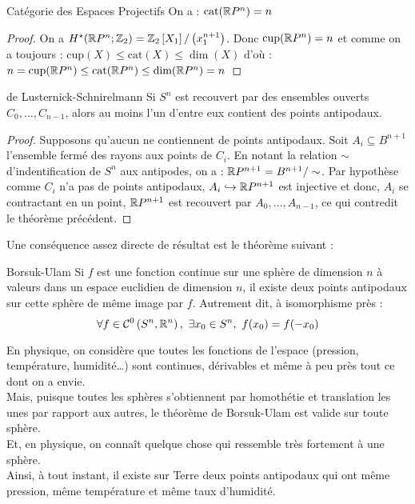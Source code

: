 \documentclass{cours}
\begin{document}
\begin{lemme}{Catégorie des Espaces Projectifs}{}
    On a\! : $\text{cat}(\mathbb{R} P^{n}) = n$
\end{lemme}
\begin{proof}
    On a $H^{\star}(\mathbb{R} P^{n}; \mathbb{Z}_{2}) = \mathbb{Z}_{2}\left[X_{1}\right]/\left(x_{1}^{n + 1}\right)$. Donc $\text{cup}(\mathbb{R} P^{n}) = n$ et comme on a toujours\! :
    $\text{cup}(X) \leq \text{cat}(X)\leq \dim(X)$ d'où\! : $n = \text{cup}(\mathbb{R} P^{n}) \leq \text{cat}(\mathbb{R} P^{n}) \leq \dim(\mathbb{R} P^{n}) = n$
\end{proof}

\begin{théorème}{de Lusternick-Schnirelmann}{}
Si $S^{n}$ est recouvert par des ensembles ouverts $C_{0}, \ldots, C_{n - 1}$, alors au moins l'un d'entre eux contient des points antipodaux.
\end{théorème}
\begin{proof}
    Supposons qu'aucun ne contiennent de points antipodaux. Soit $A_{i} \subseteq B^{n + 1}$ l'ensemble fermé des rayons aux points de $C_{i}$. En notant la relation $\sim$ d'indentification de $S^{n}$ aux antipodes, on a\! : $\mathbb{R} P^{n + 1} = B^{n + 1}/\sim$. Par hypothèse comme $C_{i}$ n'a pas de points antipodaux, $A_{i} \hookrightarrow \mathbb{R} P^{n+1}$ est injective et donc, $A_{i}$ se contractant en un point, $\mathbb{R} P^{n + 1}$ est recouvert par $A_{0}, \ldots, A_{n - 1}$, ce qui contredit le théorème précédent.
\end{proof}

Une conséquence assez directe de résultat est le théorème suivant\! :
\begin{théorème}{Borsuk-Ulam}{}
Si $f$ est une fonction continue sur une sphère de dimension $n$ à valeurs dans un espace euclidien de dimension $n$, il existe deux points antipodaux sur cette sphère de même image par $f$. Autrement dit, à isomorphisme près\! :
\[
    \forall f \in \mathcal{C}^{0}\left(S^{n}, \mathbb{R}^{n}\right), \ \exists x_{0} \in S^{n}, \ f(x_{0}) = f(-x_{0})
\]
\end{théorème}

\begin{remarque}{}{}
    En physique, on considère que toutes les fonctions de l'espace (pression, température, humidité\dots) sont continues, dérivables et même à peu près tout ce dont on a envie.\\
    Mais, puisque toutes les sphères s'obtiennent par homothétie et translation les unes par rapport aux autres, le théorème de Borsuk-Ulam est valide sur toute sphère.\\
    Et, en physique, on connaît quelque chose qui ressemble très fortement à une sphère.\\
    Ainsi, à tout instant, il existe sur Terre deux points antipodaux qui ont même pression, même température et même taux d'humidité.
\end{remarque}
\end{document}
